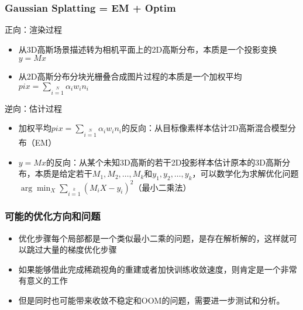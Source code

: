 \begin{frame}
    \frametitle{Gaussian Splatting = EM + Optim}
    正向：渲染过程
    \begin{itemize}
        \item 从3D高斯场景描述转为相机平面上的2D高斯分布，本质是一个投影变换$y=Mx$
        \item 从2D高斯分布分块光栅叠合成图片过程的本质是一个加权平均$pix=\sum\limits_{i=1}\limits^{N} \alpha_i w_in_i$
    \end{itemize}  
    逆向：估计过程
    \begin{itemize}
        \item 加权平均$pix=\sum\limits_{i=1}\limits^{N} \alpha_i w_in_i$的反向：从目标像素样本估计2D高斯混合模型分布（EM）
        \item $y=Mx$的反向：从某个未知3D高斯的若干2D投影样本估计原本的3D高斯分布，本质是给定若干$M_1,M_2,\dots,M_k$和$y_1,y_2,\dots,y_k$，可以数学化为求解优化问题$\arg\min_X \sum\limits_{i=1}\limits^{k} (M_iX-y_i)^2$（最小二乘法）
    \end{itemize}   
\end{frame}
\begin{frame}
    \frametitle{可能的优化方向和问题}
    \begin{itemize}
        \item 优化步骤每个局部都是一个类似最小二乘的问题，是存在解析解的，这样就可以跳过大量的梯度优化步骤
        \item 如果能够借此完成稀疏视角的重建或者加快训练收敛速度，则肯定是一个非常有意义的工作
        \item 但是同时也可能带来收敛不稳定和OOM的问题，需要进一步测试和分析。
    \end{itemize}
\end{frame}